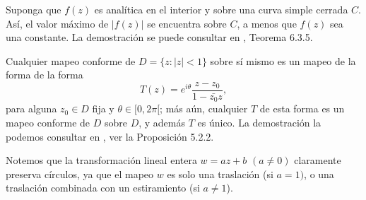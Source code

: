 \begin{teor}\label{modmx}
	Suponga que $f (z)$ es analítica en el interior y sobre una curva simple cerrada $C$. Así, el valor máximo de $| f (z)|$ se encuentra sobre $C$, a menos que $f (z)$ sea una constante.
	\proof La demostración se puede consultar en \cite{marsden}, Teorema 6.3.5.\endproof
\end{teor}
\begin{prop}
	Cualquier mapeo conforme de $D =\{ z : |z| < 1 \}$ sobre sí mismo es un mapeo de la forma de la forma
	$$T(z)=e^{i\theta}\dfrac{z-z_{0}}{1-\bar{z_{0}}z},$$
	para alguna $z_{0}\in D$ fija y $\theta \in [0, 2\pi[$; más aún, cualquier $T$ de esta forma es un mapeo conforme de $D$ sobre $D$, y además $T$ es único. 
	\proof
	La demostración la podemos consultar en \cite{marsden}, ver la Proposición  5.2.2. \endproof

\end{prop}
Notemos que la transformación lineal entera $w = az+b$ $(a\neq 0)$ claramente preserva círculos, ya que el mapeo $w$ es solo una traslación  (si $a = 1)$, o una traslación combinada con un estiramiento (si $a\neq 1$).
